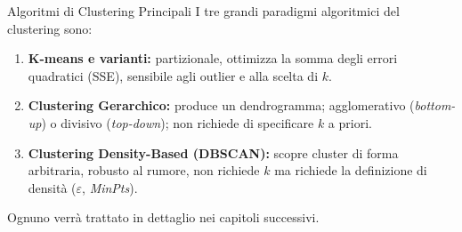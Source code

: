 \begin{noteblock}{Algoritmi di Clustering Principali}
I tre grandi paradigmi algoritmici del clustering sono:
\begin{enumerate}
  \item \textbf{K-means e varianti:} partizionale, ottimizza la somma degli errori quadratici (SSE), sensibile agli outlier e alla scelta di $k$.
  \item \textbf{Clustering Gerarchico:} produce un dendrogramma; agglomerativo (\textit{bottom-up}) o divisivo (\textit{top-down}); non richiede di specificare $k$ a priori.
  \item \textbf{Clustering Density-Based (DBSCAN):} scopre cluster di forma arbitraria, robusto al rumore, non richiede $k$ ma richiede la definizione di densità ($\varepsilon$, \textit{MinPts}).
\end{enumerate}
Ognuno verrà trattato in dettaglio nei capitoli successivi.
\end{noteblock}
